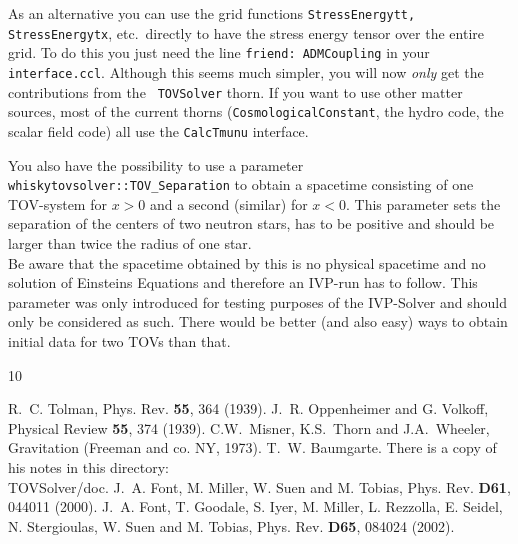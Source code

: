As an alternative you can use the grid functions {\tt StressEnergytt,
  StressEnergytx}, etc.~directly to have the stress energy tensor over
the entire grid. To do this you just need the line {\tt friend:
  ADMCoupling} in your {\tt interface.ccl}. Although this seems much
simpler, you will now \emph{only} get the contributions from the {\tt
  TOVSolver} thorn. If you want to use other matter sources, most of
the current thorns ({\tt CosmologicalConstant}, the hydro code, the
scalar field code) all use the {\tt CalcTmunu} interface.

You also have the possibility to use a parameter
{\tt whiskytovsolver::TOV\_Separation} to obtain a spacetime consisting
of one TOV-system for $x>0$ and a second (similar) for $x<0$. This parameter
sets the separation of the centers of two neutron stars, has to be positive
and should be larger than twice the radius of one star.\\
Be aware that the spacetime obtained by this is no physical spacetime and
no solution of Einsteins Equations and therefore an IVP-run has to follow.
This parameter was only introduced for testing purposes of the IVP-Solver
and should only be considered as such. There would be better (and also easy)
ways to obtain initial data for two TOVs than that.





\begin{thebibliography}{10}

R.~C. Tolman, Phys. Rev. {\bf 55}, 364 (1939).
%
J.~R. Oppenheimer and G. Volkoff, Physical Review {\bf 55}, 374 (1939).
%
C.W.~Misner, K.S.~Thorn and J.A.~Wheeler, Gravitation (Freeman and co. NY, 1973).
%
T.~W. Baumgarte. There is a copy of his notes in this directory: \\
TOVSolver/doc.
%
J.~A. Font, M. Miller, W. Suen and M. Tobias, Phys. Rev. {\bf D61},
044011 (2000).
%
J.~A. Font, T. Goodale, S. Iyer, M. Miller, L. Rezzolla, E. Seidel,
N. Stergioulas, W. Suen and M. Tobias, Phys. Rev. {\bf D65},
084024 (2002).


\end{thebibliography}








